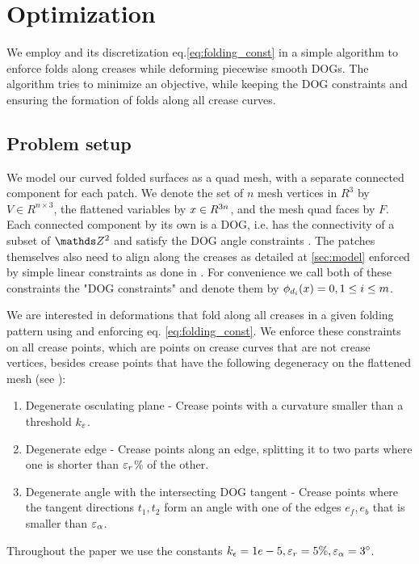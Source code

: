 \section{Optimization} \label{sec:implementation}
We employ  and its discretization eq.\eqref{eq:folding_const} in a simple algorithm to enforce folds along creases while deforming piecewise smooth DOGs. The algorithm tries to minimize an objective, while keeping the DOG constraints and ensuring the formation of folds along all crease curves.

\subsection{Problem setup}
We model our curved folded surfaces as a quad mesh, with a separate connected component for each patch. We denote the set of $n$ mesh vertices in $R^3$ by $V \in R^{n\times3}$, the flattened variables by $x \in R^{3n}$, and the mesh quad faces by $F$. Each connected component by its own is a DOG, i.e. has the connectivity of a subset of $\Z^2$ and satisfy the DOG angle constraints \cite{rabi18}. The patches themselves also need to align along the creases as detailed at \ref{sec:model} enforced by simple linear constraints as done in \cite{rabi2018shape}. For convenience we call both of these constraints the "DOG constraints" and denote them by $\phi_{d_i}(x) = 0, 1 \leq i \leq m$.

We are interested in deformations that fold along all creases in a given folding pattern using  and enforcing eq. \eqref{eq:folding_const}. We enforce these constraints on all crease points, which are points on crease curves that are not crease vertices, besides crease points that have the following degeneracy on the flattened mesh (see ):
\begin{enumerate}
	\item Degenerate osculating plane  - Crease points with a curvature smaller than a threshold $k_\varepsilon$. \label{item:deg_osc}
	\item Degenerate edge - Crease points along an edge, splitting it to two parts where one is shorter than $\varepsilon_{r}$\% of the other. \label{item:deg_edge}
	\item Degenerate angle with the intersecting DOG tangent - Crease points where the tangent directions $t_1,t_2$ form an angle with one of the edges $e_f,e_b$ that is smaller than $\varepsilon_\alpha$. \label{item:deg_tan_angle}
\end{enumerate}
Throughout the paper we use the constants $k_\epsilon=1e-5, \varepsilon_r=5\%, \varepsilon_\alpha=3^{\circ}$.

